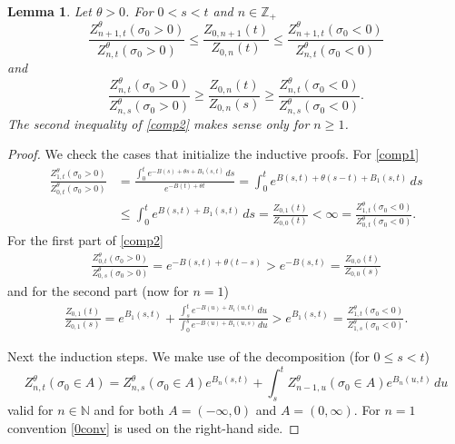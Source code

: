 \documentclass[11pt]{amsart}
\newtheorem{lemma}[theorem]{\sc Lemma}
\numberwithin{equation}{section}
\theoremstyle{remark}
\begin{document}
\begin{lemma}  Let ${\theta}>0$.  For $0< s<t$ and $n\in{\mathbb{Z}}_+$
\begin{equation}
\frac{Z_{n+1,t}^{\theta}(\sigma_0>0)}{Z_{n,t}^{\theta}(\sigma_0>0)}
\le \frac{Z_{0,n+1}(t)}{Z_{0, n}(t)}\le \frac{Z_{n+1,t}^{\theta}(\sigma_0<0)}{Z_{n,t}^{\theta}(\sigma_0<0)}
\label{comp1}\end{equation}
and 
\begin{equation}
\frac{Z_{n,t}^{\theta}(\sigma_0>0)}{Z_{n,s}^{\theta}(\sigma_0>0)}
\ge \frac{Z_{0,n}(t)}{Z_{0, n}(s)}\ge \frac{Z_{n,t}^{\theta}(\sigma_0<0)}{Z_{n,s}^{\theta}(\sigma_0<0)}. 
\label{comp2}\end{equation}
The second inequality of \eqref{comp2} makes sense only for $n\ge 1$. 
\end{lemma} 
\begin{proof} 
We check the  cases that initialize the inductive proofs.   For \eqref{comp1} 
\begin{align*}
\frac{Z_{1,t}^{\theta}(\sigma_0>0)}{Z_{0,t}^{\theta}(\sigma_0>0)} 
&=\frac{\int_0^t e^{-B(s)+{\theta} s+B_1(s,t)}\,ds}{e^{-B(t)+{\theta} t}}
=\int_0^t e^{B(s,t)+{\theta} (s-t)+B_1(s,t)}\,ds\\
&\le  \int_0^t e^{B(s,t)+B_1(s,t)}\,ds  = \frac{Z_{0,1}(t)}{Z_{0, 0}(t)}  
<\infty = \frac{Z_{1,t}^{\theta}(\sigma_0<0)}{Z_{0,t}^{\theta}(\sigma_0<0)} . 
\end{align*}
For the first part of  \eqref{comp2} 
\begin{align*}
\frac{Z_{0,t}^{\theta}(\sigma_0>0)}{Z_{0,s}^{\theta}(\sigma_0>0)}=e^{-B(s,t)+{\theta} (t-s)}
>e^{-B(s,t)}=  \frac{Z_{0,0}(t)}{Z_{0, 0}(s)}
\end{align*} 
and for the second part (now for $n=1$) 
\begin{align*}
 \frac{Z_{0,1}(t)}{Z_{0, 1}(s)} = e^{B_1(s,t)} 
 +\frac{\int_s^t e^{-B(u)+ B_1(u,t)}\,du}{\int_0^s e^{-B(u)+ B_1(u,s)}\,du} 
 >e^{B_1(s,t)}  =  \frac{Z_{1,t}^{\theta}(\sigma_0<0)}{Z_{1,s}^{\theta}(\sigma_0<0)}.
\end{align*} 

Next the induction steps.  We make use of the decomposition (for $0\le s<t$) 
\[
 {Z_{n,t}^{\theta}(\sigma_0\in A)} 
=
 {Z_{n,s}^{\theta}(\sigma_0\in A)} e^{B_n(s,t)} 
+ \int_s^t   {Z_{n-1,u}^{\theta}(\sigma_0\in A)}  e^{B_n(u,t)} \,du
\]
valid for $n\in{\mathbb{N}}$ and for both $A=(-\infty, 0)$ and $A=(0,\infty)$.  For $n=1$ 
convention \eqref{0conv} is used on the right-hand side.  


\end{proof}
\end{document}
